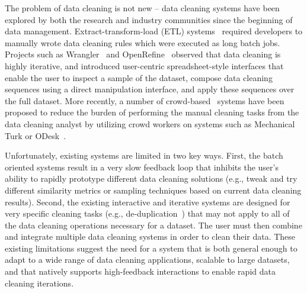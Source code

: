 The problem of data cleaning is not new -- data cleaning systems have been
explored by both the research and industry communities since the beginning of data management.
Extract-transform-load (ETL) systems~\cite{informatica,talend,nadeef,apachefalcon}
required developers to manually wrote data cleaning rules which were executed as 
long batch jobs.
Projects such as Wrangler~\cite{wrangler,trifacta} and
OpenRefine~\cite{openrefine} observed that data cleaning is highly iterative, and
introduced user-centric spreadsheet-style interfaces that enable the user to inspect a sample of the dataset, 
compose data cleaning sequences using a direct manipulation interface, and apply these sequences over the full dataset.   
More recently, a number of crowd-based~\cite{gokhale2014corleone,stonebraker2013data}
systems have been proposed to reduce the burden of performing the manual cleaning tasks from the data cleaning analyst 
by utilizing crowd workers on systems such as Mechanical Turk or ODesk~\cite{argonaut}.

Unfortunately, existing systems are limited in two key ways.
First, the batch oriented systems result in a very slow feedback loop 
that inhibits the user's ability to rapidly prototype different data cleaning solutions (e.g., tweak and 
try different similarity metrics or sampling techniques based on current data cleaning results).
Second, the existing interactive and iterative systems are designed for very specific cleaning tasks 
(e.g., de-duplication~\cite{gokhale2014corleone,park2014crowdfill,eracer,chen2014integrating}) that may not apply to all of the data 
cleaning operations necessary for a dataset.  The user must then combine and integrate multiple
data cleaning systems in order to clean their data.
These existing limitations suggest the need for a system that is both general enough to
adapt to a wide range of data cleaning applications, scalable to large datasets, 
and that natively supports high-feedback interactions to enable rapid data cleaning iterations.





